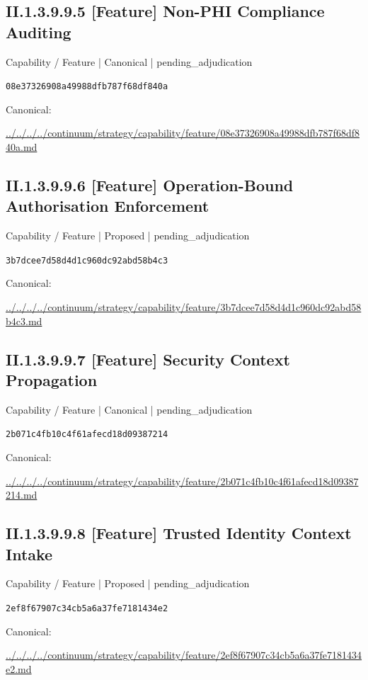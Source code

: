 \documentclass[10pt,a4paper]{article}
\begin{document}
\subsection*{II.1.3.9.9.5 [Feature] Non-PHI Compliance Auditing}
\label{element-08e37326908a49988dfb787f68df840a}
{\small Capability / Feature | Canonical | pending\_adjudication}\par
\texttt{08e37326908a49988dfb787f68df840a}\par
Canonical: \par
{\footnotesize\url{../../../../continuum/strategy/capability/feature/08e37326908a49988dfb787f68df840a.md}}\par
\subsection*{II.1.3.9.9.6 [Feature] Operation-Bound Authorisation Enforcement}
\label{element-3b7dcee7d58d4d1c960dc92abd58b4c3}
{\small Capability / Feature | Proposed | pending\_adjudication}\par
\texttt{3b7dcee7d58d4d1c960dc92abd58b4c3}\par
Canonical: \par
{\footnotesize\url{../../../../continuum/strategy/capability/feature/3b7dcee7d58d4d1c960dc92abd58b4c3.md}}\par
\subsection*{II.1.3.9.9.7 [Feature] Security Context Propagation}
\label{element-2b071c4fb10c4f61afecd18d09387214}
{\small Capability / Feature | Canonical | pending\_adjudication}\par
\texttt{2b071c4fb10c4f61afecd18d09387214}\par
Canonical: \par
{\footnotesize\url{../../../../continuum/strategy/capability/feature/2b071c4fb10c4f61afecd18d09387214.md}}\par
\subsection*{II.1.3.9.9.8 [Feature] Trusted Identity Context Intake}
\label{element-2ef8f67907c34cb5a6a37fe7181434e2}
{\small Capability / Feature | Proposed | pending\_adjudication}\par
\texttt{2ef8f67907c34cb5a6a37fe7181434e2}\par
Canonical: \par
{\footnotesize\url{../../../../continuum/strategy/capability/feature/2ef8f67907c34cb5a6a37fe7181434e2.md}}\par
\end{document}
